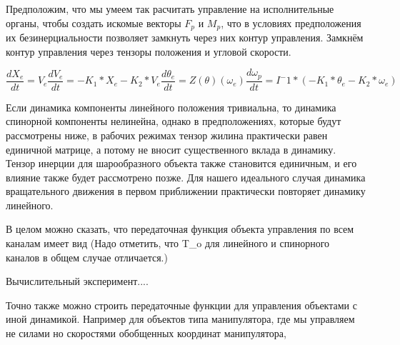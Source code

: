 \documentclass[a4paper]{article}
\begin{document}
Предположим, что мы умеем так расчитать управление на исполнительные органы, чтобы создать искомые векторы $F_p$ и $M_p$, что в условиях предположения их безинерциальности позволяет замкнуть через них контур управления. Замкнём контур управления через тензоры положения и угловой скорости.

 \begin{equation}
\frac{dX_e}{dt} = V_e
\frac{dV_e}{dt} = -K_1*X_e -K_2*V_e

\frac{d\theta_e}{dt} = Z(\theta)(\omega_e)
\frac{d\omega_p}{dt} = I^-1 * (-K_1*\theta_e -K_2*\omega_e)
\end{equation}

Если динамика компоненты линейного положения тривиальна, то динамика спинорной компоненты нелинейна, однако в
предположениях, которые будут рассмотрены ниже, в рабочих режимах тензор жилина практически равен единичной матрице, а потому не вносит существенного вклада в динамику. Тензор инерции для шарообразного объекта также становится единичным, и его влияние также будет рассмотрено позже. Для нашего идеального случая динамика вращательного движения в первом приближении практически повторяет динамику линейного.

В целом можно сказать, что передаточная функция объекта управления по всем каналам имеет вид 
 (Надо отметить, что T_o для линейного и спинорного каналов в общем случае отличается.)

Вычислительный эксперимент....

Точно также можно строить передаточные функции для управления объектами с иной динамикой. Например для объектов типа манипулятора, где мы управляем не силами но скоростями обобщенных координат манипулятора,
\end{document}
